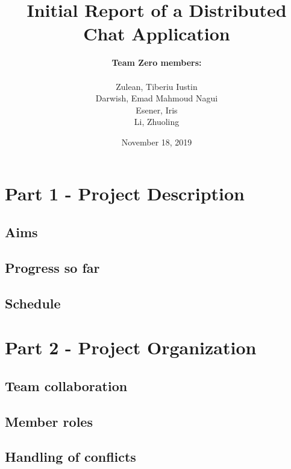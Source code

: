 \documentclass[11pt,openright,a4paper]{article}
\title{\textbf{Initial Report of a Distributed Chat Application}}
\author{\textbf{Team Zero members:} \\
		\\Zulean, Tiberiu Iustin 
		\\Darwish, Emad Mahmoud Nagui 
		\\ Esener, Iris
		\\ Li, Zhuoling
}
\date{November 18, 2019}
\begin{document}


\maketitle

\setcounter{page}{1}

\section*{Part 1 - Project Description}
\addtocounter{section}{1}
\label{part1}


\subsection{Aims}
\label{aims}



\subsection{Progress so far}
\label{progress}



\subsection{Schedule}
\label{schedule}



\section*{Part 2 - Project Organization}
\addtocounter{section}{1}
\label{part2}


\subsection{Team collaboration}
\label{collaboration}



\subsection{Member roles}
\label{roles}



\subsection{Handling of conflicts}
\label{conflicts}


\end{document}
